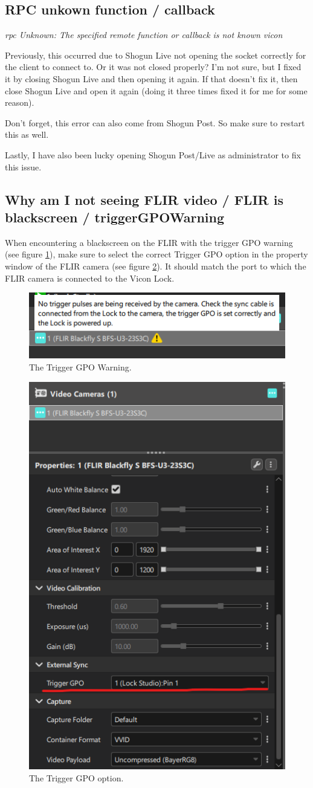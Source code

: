 \documentclass{uva-inf-article}
\begin{document}
\subsection{RPC unkown function / callback}
\textit{rpc Unknown: The specified remote function or callback is not known vicon}

Previously, this occurred due to Shogun Live not opening the socket correctly for the client to connect to. Or it was not closed properly? I'm not sure, but I fixed it by closing Shogun Live and then opening it again. If that doesn't fix it, then close Shogun Live and open it again (doing it three times fixed it for me for some reason).

Don't forget, this error can also come from Shogun Post. So make sure to restart this as well.

Lastly, I have also been lucky opening Shogun Post/Live as administrator to fix this issue.

\subsection{Why am I not seeing FLIR video / FLIR is blackscreen / triggerGPOWarning}
When encountering a blackscreen on the FLIR with the trigger GPO warning (see figure \ref{fig:triggerGPOWarning}), make sure to select the correct Trigger GPO option in the property window of the FLIR camera (see figure \ref{fig:triggerGPO}). It should match the port to which the FLIR camera is connected to the Vicon Lock.
\begin{figure}[hbt!]
    \centering
    \includegraphics[width=.5\textwidth]{imgs/triggerGPOWarning.png}
    \caption{The Trigger GPO Warning.}
    \label{fig:triggerGPOWarning}
\end{figure}
\begin{figure}[hbt!]
    \centering
    \includegraphics[width=.5\textwidth]{imgs/triggerGPO.png}
    \caption{The Trigger GPO option.}
    \label{fig:triggerGPO}
\end{figure}
\end{document}
